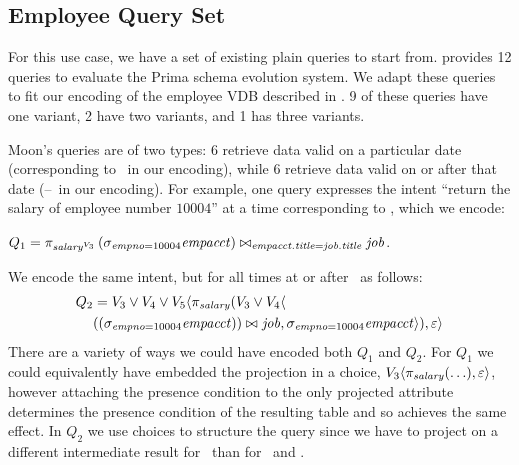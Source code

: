 \subsection{Employee Query Set}
\label{sec:emp-qs}


For this use case, we have a set of existing plain queries to start from.
\cite{prima08Moon}  provides 12 queries to evaluate the Prima schema evolution
system. We adapt these queries to fit our encoding of the employee VDB
described in .
%
%
9 of these queries have one variant, 2 have two variants, and 1 has three
variants. 


Moon's queries are of two types: 6 retrieve data valid on a particular date
(corresponding to \vThree\ in our encoding), while 6 retrieve data valid on or
after that date (\vThree--\vFive\ in our encoding).
%
For example, one query expresses the intent ``return the salary of employee
number $10004$'' at a time corresponding to \vThree, which we encode:
\centerline{
\ensuremath{
Q_1 = \vPrj[\oatt{\salary}{\vThree}]{%
  \joinRelR{\selectRel{\empno=10004}{\empacct}}{\job}
           {\empacct.\titleatt = \job.\titleatt}}
}.}
%
%
We encode the same intent, but for all times at or after \vThree\ as follows:
%
\begin{align*}
Q_2 &=  \vThree\vee\vFour\vee\vFive \langle \pi_\salary 
 (\vThree\vee\vFour\langle\\
&    \joinRelR{(\vSel[\empno=10004]{\empacct})}{\job}
             {}, 
{\vSel[\empno=10004]{\empacct}}\rangle), \empRel\rangle
\end{align*}
%
There are a variety of ways we could have encoded both $Q_1$ and $Q_2$.
%
For $Q_1$ we could equivalently have embedded the projection in a choice,
$\chc[\vThree]{\vPrj[\salary]{(\ldots)},\empRel}$, however attaching the presence
condition to the only projected attribute determines the presence condition of
the resulting table and so achieves the same effect.
%
In $Q_2$ we use choices to structure the query since we have to project on a
different intermediate result for \vFive\ than for \vThree\ and \vFour.

